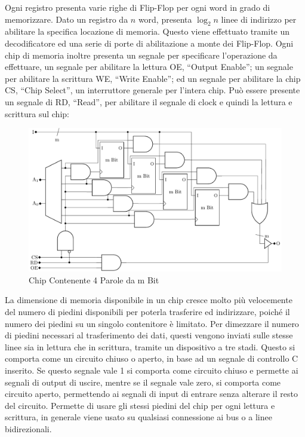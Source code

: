 \documentclass{article}
\numberwithin{equation}{subsection}
\begin{document}
Ogni registro presenta varie righe di Flip-Flop per ogni word in grado di memorizzare. Dato un registro da $n$ word, presenta $\log_2n$ linee di indirizzo per abilitare la specifica locazione di memoria. Questo 
viene effettuato tramite un decodificatore ed una serie di porte di abilitazione a monte dei Flip-Flop. Ogni chip di memoria inoltre presenta un segnale per specificare l'operazione da effettuare, un segnale 
per abilitare la lettura OE, ``Output Enable''; un segnale per abilitare la scrittura WE, ``Write Enable''; ed un segnale per abilitare la chip CS, ``Chip Select'', un interruttore generale per l'intera chip. 
Può essere presente un segnale di RD, ``Read'', per abilitare il segnale di clock e quindi la lettura e scrittura sul chip:

\begin{figure}[H]%
    \centering%
    \includegraphics[scale=0.8]{chip-memoria.pdf}%
    \caption{Chip Contenente 4 Parole da m Bit}%
\end{figure}

La dimensione di memoria disponibile in un chip cresce molto più velocemente del numero di piedini disponibili per poterla trasferire ed indirizzare, poiché il numero dei piedini su un singolo contenitore è 
limitato. 
Per dimezzare il numero di piedini necessari al trasferimento dei dati, questi vengono inviati sulle stesse linee sia in lettura che in scrittura, tramite un dispositivo a tre stadi. Questo si comporta come un 
circuito chiuso o aperto, in base ad un segnale di controllo C inserito. Se questo segnale vale 1 si comporta come circuito chiuso e permette ai segnali di output di uscire, mentre se il segnale vale zero, si 
comporta come circuito aperto, permettendo ai segnali di input di entrare senza alterare il resto del circuito. Permette di usare gli stessi piedini del chip per ogni lettura e scrittura, in generale viene usato su 
qualsiasi connessione ai bus o a linee bidirezionali. 
\end{document}
